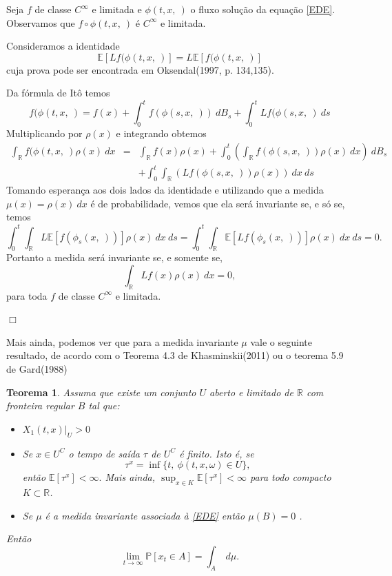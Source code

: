 \documentclass[12pt]{article}
\newtheorem{teo}{Teorema}%
\newenvironment{proof}{\noindent{\it Demonstra\c{c}\~ao.} }{\hfill $\Box$ \newline}
\begin{document}
\begin{proof} Seja $f$ de classe $C^\infty$ e limitada e $\phi(t,x,~)$ o fluxo solução da equação \ref{EDE}. Observamos que $f\circ \phi(t,x,~)$ é $C^\infty$ e limitada. 

Consideramos a identidade
\[
\mathbb{E}[Lf(\phi(t,x,~)]=L\mathbb{E}[f(\phi(t,x,~)]
\]
cuja prova pode ser encontrada em Oksendal(1997, p. 134,135). 



Da fórmula de Itô temos 
\[
f(\phi(t,x,~)=f(x)+\int_0^tf(\phi(s,x,~))~dB_s+\int_0^tLf(\phi(s,x,~)~ds
\]
Multiplicando por $\rho(x)$ e integrando obtemos 
\begin{eqnarray*}
\int_{ \mathbb{R}}f(\phi(t,x,~)\rho(x)~dx&=&\int_{ \mathbb{R}}f(x)\rho(x)+\int_0^t\left(\int_{ \mathbb{R}}f(\phi(s,x,~))\rho(x)~dx\right)~dB_s\\
&&+\int_0^t\int_{ \mathbb{R}}(Lf(\phi(s,x,~))\rho(x))~dx~ds
\end{eqnarray*}
Tomando esperança aos dois lados da identidade e utilizando que a medida $\mu(x)=\rho(x)~dx$ é de probabilidade, vemos que ela será invariante se, e só se,  temos
\[
\int_0^t\int_{ \mathbb{R}}L\mathbb{E}\left[f(\phi_s(x,~))\right]\rho(x)~dx~ds=\int_0^t\int_{ \mathbb{R}}\mathbb{E}\left[Lf(\phi_s(x,~))\right]\rho(x)~dx~ds=0.
\]
Portanto a medida será invariante se, e somente se, 
\[
\int_{\mathbb{R}}Lf(x)\rho(x)~dx=0,
\]
para toda $f$ de classe $C^\infty$ e limitada. 

\end{proof}



Mais ainda, podemos ver que para a medida invariante $\mu$ vale o seguinte resultado, de acordo com o Teorema 4.3 de Khasminskii(2011) ou o teorema 5.9 de Gard(1988)
\begin{teo}\label{khansminskii} Assuma que existe um conjunto $U$ aberto e limitado de $\mathbb{R}$ com fronteira regular $B$ tal que: 
\begin{itemize}
\item [a-]  $X_1(t,x)|_U>0$
\item [b-] Se $x\in U^C$ o tempo de saída $\tau$ de $U^C$ é finito. Isto é, se 
\[
\tau^x=\inf\{t,~\phi(t,x,\omega)\in U \},
\]
então $ \mathbb{E}\left[\tau^x\right]<\infty.$
Mais ainda, $\sup_{x\in K}\mathbb{E}[\tau^x]<\infty$ para todo compacto $K\subset \mathbb{R}$.
\item [c-] Se $\mu$ é a medida invariante associada à \ref{EDE} então $\mu(B)=0$ .
\end{itemize}
Então  
\[
\lim_{t\rightarrow \infty}\mathbb{P}[x_t\in A]=\int_A~d\mu.
\]
\end{teo} 
\end{document}
